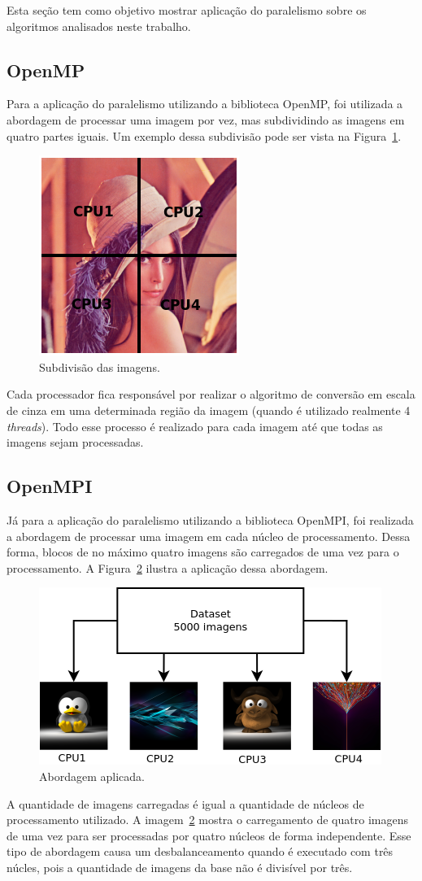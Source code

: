 Esta seção tem como objetivo mostrar aplicação do paralelismo sobre os
algoritmos analisados neste trabalho.

\subsection{OpenMP}

Para a aplicação do paralelismo utilizando a biblioteca OpenMP, foi utilizada a
abordagem de processar uma imagem por vez, mas subdividindo as imagens em quatro
partes iguais. Um exemplo dessa subdivisão pode ser vista na
Figura~\ref{fig:lena}.

\begin{figure}[!h]
	\centering
	\includegraphics[width=0.3\linewidth]{figs/lenna.png}
	\caption{Subdivisão das imagens.}
	\label{fig:lena}
\end{figure}

Cada processador fica responsável por realizar o algoritmo de conversão em
escala de cinza em uma determinada região da imagem (quando é utilizado
realmente 4 \textit{threads}). Todo esse processo é realizado para cada imagem
até que todas as imagens sejam processadas.

\subsection{OpenMPI}

Já para a aplicação do paralelismo utilizando a biblioteca OpenMPI, foi
realizada a abordagem de processar uma imagem em cada núcleo de processamento.
Dessa forma, blocos de no máximo quatro imagens são carregados de uma vez para o
processamento. A Figura~\ref{fig:mpi} ilustra a aplicação dessa abordagem.

\begin{figure}[!h]
	\centering
	\includegraphics[width=0.5\linewidth]{figs/mpi}
	\caption{Abordagem aplicada.}
	\label{fig:mpi}
\end{figure}

A quantidade de imagens carregadas é igual a quantidade de núcleos de
processamento utilizado. A imagem~\ref{fig:mpi} mostra o carregamento de quatro
imagens de uma vez para ser processadas por quatro núcleos de forma
independente. Esse tipo de abordagem causa um desbalanceamento quando é
executado com três núcles, pois a quantidade de imagens da base não é divisível
por três.




